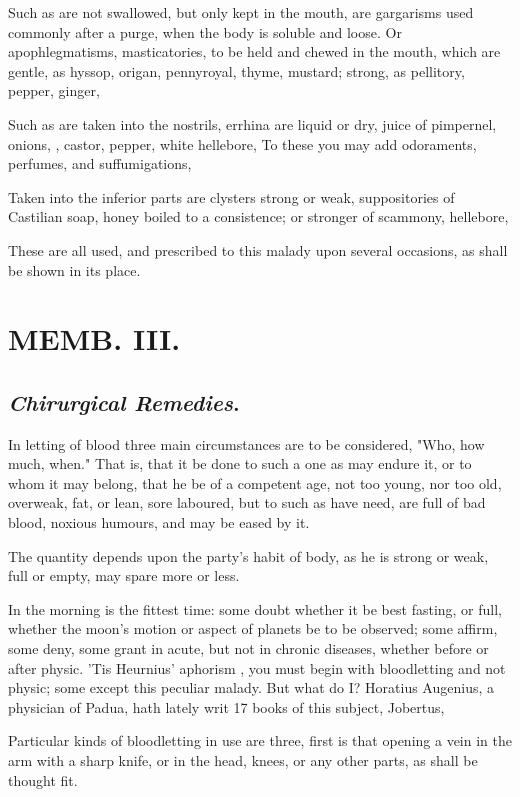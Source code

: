 {Such as are not swallowed, but only kept in the mouth, are gargarisms used commonly after a purge, when the body is soluble and loose. Or apophlegmatisms, masticatories, to be held and chewed in the mouth, which are gentle, as hyssop, origan, pennyroyal, thyme, mustard; strong, as pellitory, pepper, ginger, \etc{}

Such as are taken into the nostrils, errhina are liquid or dry, juice of pimpernel, onions, \etc{}, castor, pepper, white hellebore, \etc{} To these you may add odoraments, perfumes, and suffumigations, \etc{}

Taken into the inferior parts are clysters strong or weak, suppositories of Castilian soap, honey boiled to a consistence; or stronger of scammony, hellebore, \etc{}

These are all used, and prescribed to this malady upon several occasions, as shall be shown in its place.

\chapter{ MEMB. III.}


\section{\emph{Chirurgical Remedies}.}


In letting of blood three main circumstances are to be considered, "Who, how much, when." That is, that it be done to such a one as may endure it, or to whom it may belong, that he be of a competent age, not too young, nor too old, overweak, fat, or lean, sore laboured, but to such as have need, are full of bad blood, noxious humours, and may be eased by it.

The quantity depends upon the party's habit of body, as he is strong or weak, full or empty, may spare more or less.

In the morning is the fittest time: some doubt whether it be best fasting, or full, whether the moon's motion or aspect of planets be to be observed; some affirm, some deny, some grant in acute, but not in chronic diseases, whether before or after physic. 'Tis Heurnius' aphorism , you must begin with bloodletting and not physic; some except this peculiar malady. But what do I? Horatius Augenius, a physician of Padua, hath lately writ 17 books of this subject, Jobertus, \etc{}

Particular kinds of bloodletting in use are three, first is that opening a vein in the arm with a sharp knife, or in the head, knees, or any other parts, as shall be thought fit.

}
